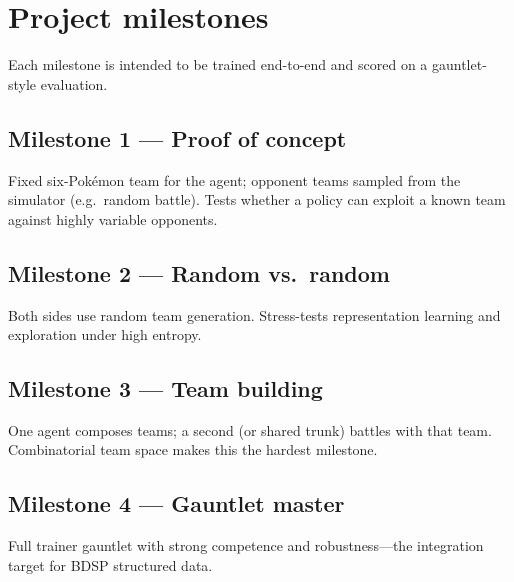 \chapter{Project milestones}

Each milestone is intended to be trained end-to-end and scored on a gauntlet-style evaluation.

\section{Milestone 1 --- Proof of concept}
Fixed six-Pok\'{e}mon team for the agent; opponent teams sampled from the simulator (e.g.\ random battle). Tests whether a policy can exploit a known team against highly variable opponents.

\section{Milestone 2 --- Random vs.\ random}
Both sides use random team generation. Stress-tests representation learning and exploration under high entropy.

\section{Milestone 3 --- Team building}
One agent composes teams; a second (or shared trunk) battles with that team. Combinatorial team space makes this the hardest milestone.

\section{Milestone 4 --- Gauntlet master}
Full trainer gauntlet with strong competence and robustness---the integration target for BDSP structured data.
